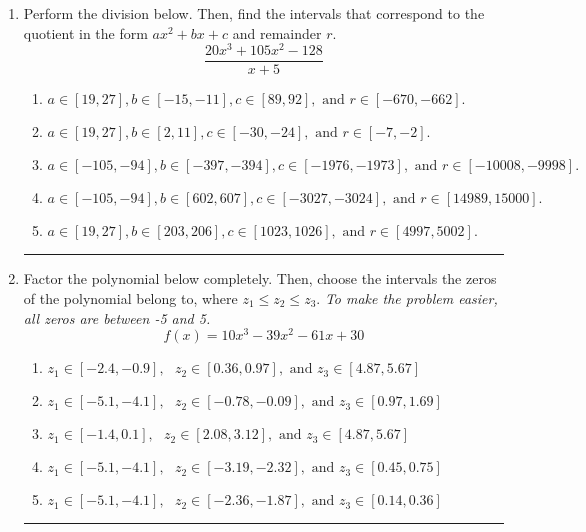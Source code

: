 \documentclass[14pt]{extbook}
\newcommand{\litem}[1]{\item#1\hspace*{-1cm}\rule{\textwidth}{0.4pt}}
\begin{document}
\begin{enumerate}
{\begin{enumerate}[label=\Alph*.]
\end{enumerate} }
\litem{
Perform the division below. Then, find the intervals that correspond to the quotient in the form $ax^2+bx+c$ and remainder $r$.\[ \frac{20x^{3} +105 x^{2} -128}{x + 5} \]\begin{enumerate}[label=\Alph*.]
\item \( a \in [19, 27], b \in [-15, -11], c \in [89, 92], \text{ and } r \in [-670, -662]. \)
\item \( a \in [19, 27], b \in [2, 11], c \in [-30, -24], \text{ and } r \in [-7, -2]. \)
\item \( a \in [-105, -94], b \in [-397, -394], c \in [-1976, -1973], \text{ and } r \in [-10008, -9998]. \)
\item \( a \in [-105, -94], b \in [602, 607], c \in [-3027, -3024], \text{ and } r \in [14989, 15000]. \)
\item \( a \in [19, 27], b \in [203, 206], c \in [1023, 1026], \text{ and } r \in [4997, 5002]. \)

\end{enumerate} }
\litem{
Factor the polynomial below completely. Then, choose the intervals the zeros of the polynomial belong to, where $z_1 \leq z_2 \leq z_3$. \textit{To make the problem easier, all zeros are between -5 and 5.}\[ f(x) = 10x^{3} -39 x^{2} -61 x + 30 \]\begin{enumerate}[label=\Alph*.]
\item \( z_1 \in [-2.4, -0.9], \text{   }  z_2 \in [0.36, 0.97], \text{   and   } z_3 \in [4.87, 5.67] \)
\item \( z_1 \in [-5.1, -4.1], \text{   }  z_2 \in [-0.78, -0.09], \text{   and   } z_3 \in [0.97, 1.69] \)
\item \( z_1 \in [-1.4, 0.1], \text{   }  z_2 \in [2.08, 3.12], \text{   and   } z_3 \in [4.87, 5.67] \)
\item \( z_1 \in [-5.1, -4.1], \text{   }  z_2 \in [-3.19, -2.32], \text{   and   } z_3 \in [0.45, 0.75] \)
\item \( z_1 \in [-5.1, -4.1], \text{   }  z_2 \in [-2.36, -1.87], \text{   and   } z_3 \in [0.14, 0.36] \)


\end{enumerate}}
\end{enumerate}
\end{document}
